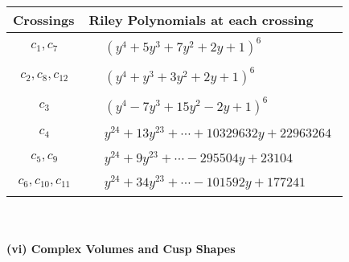 \documentclass[1p]{elsarticle_modified}
\theoremstyle{definition}
\begin{document}
\begin{tabular}{m{50pt}|m{274pt}}
Crossings & \hspace{64pt}Riley Polynomials at each crossing \\
\hline $$\begin{aligned}c_{1},c_{7}\end{aligned}$$&$\begin{aligned}
&(y^4+5 y^3+7 y^2+2 y+1)^6
\end{aligned}$\\
\hline $$\begin{aligned}c_{2},c_{8},c_{12}\end{aligned}$$&$\begin{aligned}
&(y^4+y^3+3 y^2+2 y+1)^6
\end{aligned}$\\
\hline $$\begin{aligned}c_{3}\end{aligned}$$&$\begin{aligned}
&(y^4-7 y^3+15 y^2-2 y+1)^6
\end{aligned}$\\
\hline $$\begin{aligned}c_{4}\end{aligned}$$&$\begin{aligned}
&y^{24}+13 y^{23}+\cdots+10329632 y+22963264
\end{aligned}$\\
\hline $$\begin{aligned}c_{5},c_{9}\end{aligned}$$&$\begin{aligned}
&y^{24}+9 y^{23}+\cdots-295504 y+23104
\end{aligned}$\\
\hline $$\begin{aligned}c_{6},c_{10},c_{11}\end{aligned}$$&$\begin{aligned}
&y^{24}+34 y^{23}+\cdots-101592 y+177241
\end{aligned}$\\
\hline
\end{tabular}\\~\\
\newpage\flushleft \textbf{(vi) Complex Volumes and Cusp Shapes}
\end{document}

